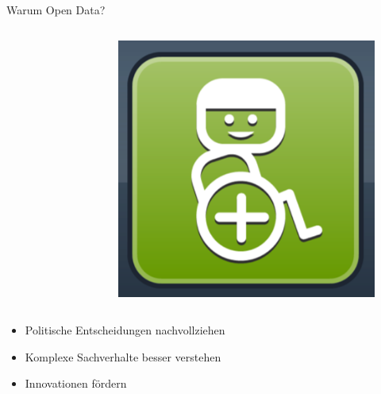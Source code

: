\begin{frame}[t]{Warum Open Data?}
\begin{columns}
\begin{figure}[h]
  \end{figure}
  \begin{figure}[h]
   \centering
   \includegraphics[scale=0.2]{section_open_data_innovation.png}
  \end{figure}
 \end{columns}

 \begin{block}{}
  \begin{itemize}
  \item Politische Entscheidungen nachvollziehen
  \item Komplexe Sachverhalte besser verstehen
  \item Innovationen fördern
 \end{itemize}
\end{block} 
\end{frame}